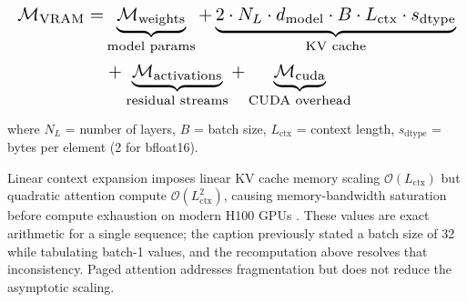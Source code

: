 \documentclass{article}
\begin{document}
\begin{equation}
\resizebox{\columnwidth}{!}{$\displaystyle
\begin{aligned}
\mathcal{M}_{\text{VRAM}} = & \underbrace{\mathcal{M}_{\text{weights}}}_{\text{model params}} + \underbrace{2 \cdot N_L \cdot d_{\text{model}} \cdot B \cdot L_{\text{ctx}} \cdot s_{\text{dtype}}}_{\text{KV cache}} \\
& + \underbrace{\mathcal{M}_{\text{activations}}}_{\text{residual streams}} + \underbrace{\mathcal{M}_{\text{cuda}}}_{\text{CUDA overhead}}
\end{aligned}
$}
\end{equation}















where $N_L$ = number of layers, $B$ = batch size, $L_{\text{ctx}}$ = context length, $s_{\text{dtype}}$ = bytes per element (2 for bfloat16).

\begin{table}[htbp]
\centering
\caption{KV Cache Memory at Various Context Lengths ($N_L = 80$, $d_{\text{model}} = 8192$, $B = 1$, bfloat16)}
\end{table}

Linear context expansion imposes linear KV cache memory scaling $\mathcal{O}(L_{\text{ctx}})$ but quadratic attention compute $\mathcal{O}(L_{\text{ctx}}^2)$, causing memory-bandwidth saturation before compute exhaustion on modern H100 GPUs \cite{arxiv_2501_02497,arxiv_2502_18080}. These values are exact arithmetic for a single sequence; the caption previously stated a batch size of 32 while tabulating batch-1 values, and the recomputation above resolves that inconsistency. Paged attention \cite{arxiv_2406_04028} addresses fragmentation but does not reduce the asymptotic scaling.
\end{document}
